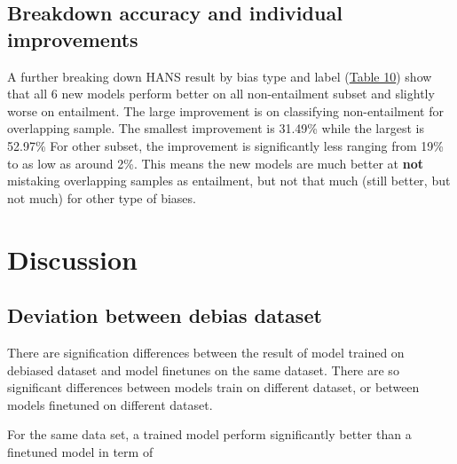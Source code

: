 \documentclass{article}
\begin{document}
\subsection{Breakdown accuracy and individual improvements}

A further breaking down HANS result by bias type and label (\hyperref[table10]{Table 10}) show that all 6 new models perform better on all non-entailment subset and slightly worse on entailment.
The large improvement is on classifying non-entailment for overlapping sample.
The smallest improvement is 31.49\% while the largest is 52.97\%
For other subset, the improvement is significantly less ranging from 19\% to as low as around 2\%.
This means the new models are much better at \textbf{not} mistaking overlapping samples as entailment, but not that much (still better, but not much) for other type of biases.

\section{Discussion}
\subsection{Deviation between debias dataset}
There are signification differences between the result of model trained on debiased dataset and model finetunes on the same dataset.
There are so significant differences between models train on different dataset, or between models finetuned on different dataset.

For the same data set, a trained model perform significantly better than a finetuned model in term of 
\end{document}
